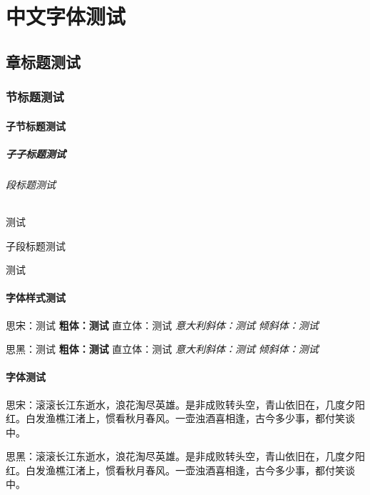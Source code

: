 \documentclass{../../PublicResources/DocClassLight}
\begin{document}
    \maketitle
    \frontmatter
    {\centering \tableofcontents} %
    \mainmatter

    \part{中文字体测试}
    \chapter{章标题测试}
    \section{节标题测试}
    \subsection{子节标题测试}
    \subsubsection{子子标题测试}
    \paragraph{段标题测试}
    测试
    \subparagraph{子段标题测试}
    测试

    \subsection{字体样式测试}
    {\rmfamily 思宋：测试 \textbf{粗体：测试} \textup{直立体：测试} \textit{意大利斜体：测试} \textsl{倾斜体：测试}}

    {\sffamily 思黑：测试 \textbf{粗体：测试} \textup{直立体：测试} \textit{意大利斜体：测试} \textsl{倾斜体：测试}}

    \subsection{字体测试}
    {\rmfamily 思宋：滚滚长江东逝水，浪花淘尽英雄。是非成败转头空，青山依旧在，几度夕阳红。白发渔樵江渚上，惯看秋月春风。一壶浊酒喜相逢，古今多少事，都付笑谈中。}

    {\sffamily 思黑：滚滚长江东逝水，浪花淘尽英雄。是非成败转头空，青山依旧在，几度夕阳红。白发渔樵江渚上，惯看秋月春风。一壶浊酒喜相逢，古今多少事，都付笑谈中。}
\end{document}
